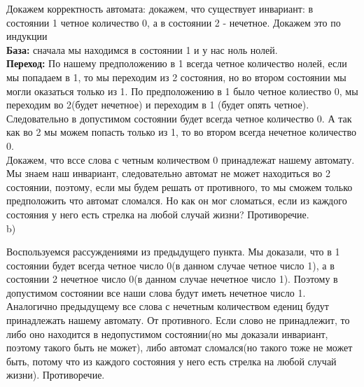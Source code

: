 \documentclass[a4paper,12pt]{article}
\begin{document}
Докажем корректность автомата: докажем, что существует инвариант: в состоянии 1 четное количество 0, а в состоянии 2 - нечетное. Докажем это по индукции\\
\textbf{База:} сначала мы находимся в состоянии 1 и у нас ноль нолей. \\
\textbf{Переход:} По нашему предположению в 1 всегда четное количество нолей, если мы попадаем в 1, то мы переходим из 2 состояния, но во втором состоянии мы могли оказаться только из 1. По предположению в 1 было четное колиество 0, мы переходим во 2(будет нечетное) и переходим в 1 (будет опять четное).\\
Следовательно в допустимом состоянии будет всегда четное количество 0. А так как во 2 мы можем попасть только из 1, то во втором всегда нечетное количество 0.\\
Докажем, что вссе слова с четным количеством 0 принадлежат нашему автомату. Мы знаем наш инвариант, следовательно автомат не может находиться во 2 состоянии, поэтому, если мы будем решать от противного, то мы сможем только предположить что автомат сломался. Но как он мог сломаться, если из каждого состояния у него есть стрелка на любой случай жизни? Противоречие.\\
b)\\
\begin{center} 
\end{center}
Воспользуемся рассуждениями из предыдущего пункта. Мы доказали, что в 1 состоянии будет всегда четное число 0(в данном случае четное число 1), а в состоянии 2 нечетное число 0(в данном случае нечетное число 1). Поэтому в допустимом состоянии все наши слова будут иметь нечетное число 1. Аналогично предыдущему все слова с нечетным количеством едениц будут принадлежать нашему автомату. От противного. Если слово не принадлежит, то либо оно находится в недопустимом состоянии(но мы доказали инвариант, поэтому такого быть не может), либо автомат сломался(но такого тоже не может быть, потому что из каждого состояния у него есть стрелка на любой случай жизни). Противоречие.\\
\end{document}
